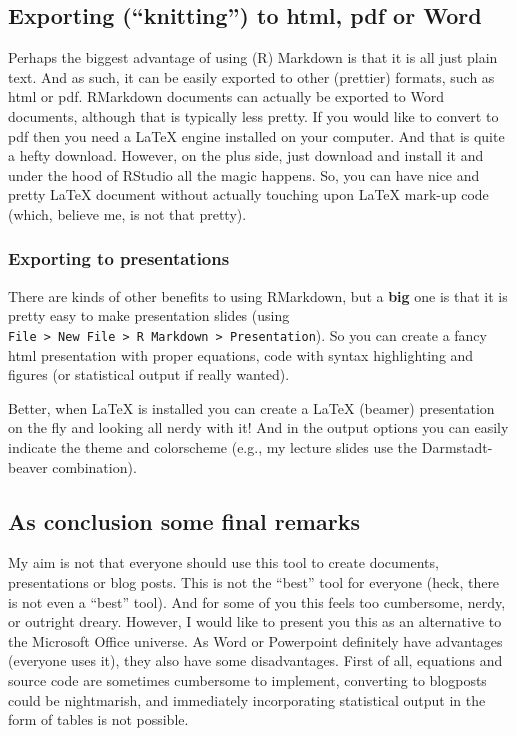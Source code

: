 \documentclass[]{article}
\theoremstyle{definition}
\theoremstyle{definition}
\theoremstyle{definition}
\theoremstyle{remark}
\begin{document}
\subsection{\texorpdfstring{Exporting (``knitting'') to html, pdf or
Word}{Exporting (knitting) to html, pdf or Word}}\label{exporting-knitting-to-html-pdf-or-word}

Perhaps the biggest advantage of using (R) Markdown is that it is all
just plain text. And as such, it can be easily exported to other
(prettier) formats, such as html or pdf. RMarkdown documents can
actually be exported to Word documents, although that is typically less
pretty. If you would like to convert to pdf then you need a LaTeX engine
installed on your computer. And that is quite a hefty download. However,
on the plus side, just download and install it and under the hood of
RStudio all the magic happens. So, you can have nice and pretty LaTeX
document without actually touching upon LaTeX mark-up code (which,
believe me, is not that pretty).

\subsubsection{Exporting to
presentations}\label{exporting-to-presentations}

There are kinds of other benefits to using RMarkdown, but a \textbf{big}
one is that it is pretty easy to make presentation slides (using
\texttt{File\ \textgreater{}\ New\ File\ \textgreater{}\ R\ Markdown\ \textgreater{}\ Presentation}).
So you can create a fancy html presentation with proper equations, code
with syntax highlighting and figures (or statistical output if really
wanted).

Better, when LaTeX is installed you can create a LaTeX (beamer)
presentation on the fly and looking all nerdy with it! And in the output
options you can easily indicate the theme and colorscheme (e.g., my
lecture slides use the Darmstadt-beaver combination).

\subsection{As conclusion some final
remarks}\label{as-conclusion-some-final-remarks}

My aim is not that everyone should use this tool to create documents,
presentations or blog posts. This is not the ``best'' tool for everyone
(heck, there is not even a ``best'' tool). And for some of you this
feels too cumbersome, nerdy, or outright dreary. However, I would like
to present you this as an alternative to the Microsoft Office universe.
As Word or Powerpoint definitely have advantages (everyone uses it),
they also have some disadvantages. First of all, equations and source
code are sometimes cumbersome to implement, converting to blogposts
could be nightmarish, and immediately incorporating statistical output
in the form of tables is not possible.
\end{document}
